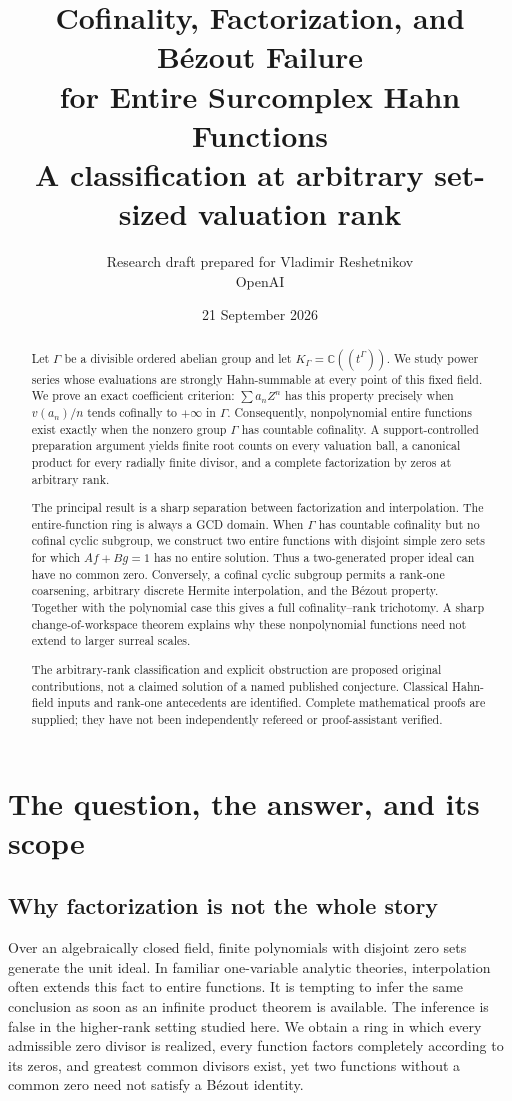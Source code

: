 \documentclass[11pt]{article}
\title{\textbf{Cofinality, Factorization, and B\'ezout Failure\\
for Entire Surcomplex Hahn Functions}\\[5pt]
\large A classification at arbitrary set-sized valuation rank}
\author{Research draft prepared for Vladimir Reshetnikov\\
\small OpenAI}
\date{21 September 2026}
\theoremstyle{plain}
\theoremstyle{plain}
\theoremstyle{plain}
\theoremstyle{definition}
\theoremstyle{definition}
\theoremstyle{definition}
\theoremstyle{remark}
\newcommand{\C}{\mathbb C}\newcommand{\R}{\mathbb R}
\begin{document}
\maketitle
\begin{abstract}
Let $\Gamma$ be a divisible ordered abelian group and let
$K_\Gamma=\C((t^\Gamma))$. We study power series whose evaluations are
strongly Hahn-summable at every point of this fixed field. We prove an
exact coefficient criterion: $\sum a_nZ^n$ has this property precisely
when $v(a_n)/n$ tends cofinally to $+\infty$ in $\Gamma$. Consequently,
nonpolynomial entire functions exist exactly when the nonzero group
$\Gamma$ has countable cofinality. A support-controlled preparation
argument yields finite root counts on every valuation ball, a canonical
product for every radially finite divisor, and a complete factorization
by zeros at arbitrary rank.

The principal result is a sharp separation between factorization and
interpolation. The entire-function ring is always a GCD domain. When
$\Gamma$ has countable cofinality but no cofinal cyclic subgroup, we
construct two entire functions with disjoint simple zero sets for which
$Af+Bg=1$ has no entire solution. Thus a two-generated proper ideal can
have no common zero. Conversely, a cofinal cyclic subgroup permits a
rank-one coarsening, arbitrary discrete Hermite interpolation, and the
B\'ezout property. Together with the polynomial case this gives a full
cofinality--rank trichotomy. A sharp change-of-workspace theorem explains
why these nonpolynomial functions need not extend to larger surreal
scales.

The arbitrary-rank classification and explicit obstruction are proposed
original contributions, not a claimed solution of a named published
conjecture. Classical Hahn-field inputs and rank-one antecedents are
identified. Complete mathematical proofs are supplied; they have not
been independently refereed or proof-assistant verified.
\end{abstract}
\newpage
\tableofcontents
\newpage

\section{The question, the answer, and its scope}
\label{sec:intro}

\subsection{Why factorization is not the whole story}
Over an algebraically closed field, finite polynomials with disjoint zero
sets generate the unit ideal. In familiar one-variable analytic theories,
interpolation often extends this fact to entire functions. It is tempting
to infer the same conclusion as soon as an infinite product theorem is
available. The inference is false in the higher-rank setting studied here.
We obtain a ring in which every admissible zero divisor is realized, every
function factors completely according to its zeros, and greatest common
divisors exist, yet two functions without a common zero need not satisfy
a B\'ezout identity.
\end{document}
